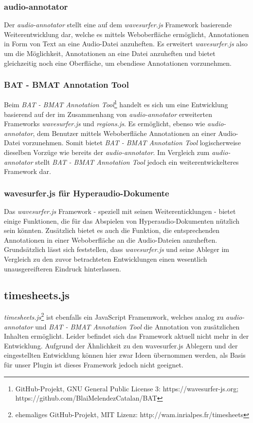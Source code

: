 \subsubsection{audio-annotator}
Der \textit{audio-annotator} stellt eine auf dem \textit{wavesurfer.js} Framework basierende Weiterentwicklung dar, welche es mittels Weboberfläche ermöglicht, Annotationen in Form von Text an eine Audio-Datei anzuheften. Es erweitert \textit{wavesurfer.js} also um die Möglichkeit, Annotationen an eine Datei anzuheften und bietet gleichzeitig noch eine Oberfläche, um ebendiese Annotationen vorzunehmen.

\subsubsection{BAT - BMAT Annotation Tool}
Beim \textit{BAT - BMAT Annotation Tool}\footnote{GitHub-Projekt, GNU General Public License 3: https://wavesurfer-js.org; https://github.com/BlaiMelendezCatalan/BAT} handelt es sich um eine Entwicklung basierend auf der im Zusammenhang von \textit{audio-annotator} erweiterten Frameworks \textit{wavesurfer.js} und \textit{regions.js}. Es ermöglicht, ebenso wie \textit{audio-annotator}, dem Benutzer mittels Weboberfläche Annotationen an einer Audio-Datei vorzunehmen. Somit bietet \textit{BAT - BMAT Annotation Tool} logischerweise dieselben Vorzüge wie bereits der \textit{audio-annotator}. Im Vergleich zum \textit{audio-annotator} stellt \textit{BAT - BMAT Annotation Tool} jedoch ein weiterentwickelteres Framework dar.


\subsubsection{wavesurfer.js für Hyperaudio-Dokumente}
Das \textit{wavesurfer.js} Framework - speziell mit seinen Weiterenticklungen - bietet einige Funktionen, die für das Abspielen von Hyperaudio-Dokumenten nützlich sein könnten. Zusätzlich bietet es auch die Funktion,  die entsprechenden Annotationen in einer Weboberfläche an die Audio-Dateien anzuheften. Grundsätzlich lässt sich feststellen, dass \textit{wavesurfer.js} und seine Ableger im Vergleich zu den zuvor betrachteten Entwicklungen einen wesentlich unausgereifteren Eindruck hinterlassen.

\subsection{timesheets.js}
\textit{timesheets.js}\footnote{ehemaliges GitHub-Projekt, MIT Lizenz: http://wam.inrialpes.fr/timesheets} ist ebenfalls ein JavaScript Framemwork, welches analog zu \textit{audio-annotator} und \textit{BAT - BMAT Annotation Tool} die Annotation von zusätzlichen Inhalten ermöglicht. Leider befindet sich das Framework aktuell nicht mehr in der Entwicklung. Aufgrund der Ähnlichkeit zu den {wavesurfer.js} Ablegern und der eingestellten Entwicklung können hier zwar Ideen übernommen werden, als Basis für unser Plugin ist dieses Framework jedoch nicht geeignet.

